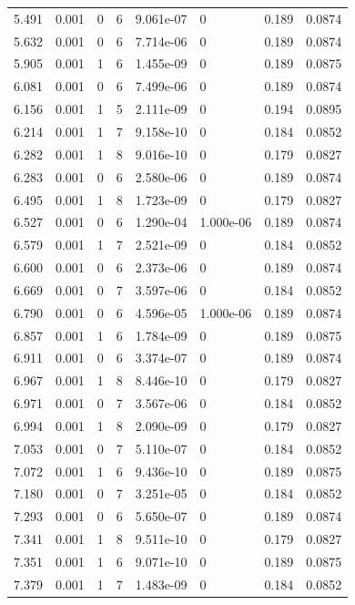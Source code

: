 \documentclass[preview]{standalone}
\begin{document}
{{\begin{tabular}{L{1.2cm}C{1.2cm} C{0.3cm}C{0.5cm} C{1.4cm}C{1.4cm} C{1.4cm}C{1.4cm}}
  5.491  &  0.001  & 0     &  6 &  9.061e-07  & 0  & 0.189 &  0.0874   \\ 
  5.632  &  0.001  & 0     &  6 &  7.714e-06  & 0  & 0.189 &  0.0874   \\ 
  5.905  &  0.001  & 1     &  6 &  1.455e-09  & 0  & 0.189 &  0.0875   \\ 
  6.081  &  0.001  & 0     &  6 &  7.499e-06  & 0  & 0.189 &  0.0874   \\ 
  6.156  &  0.001  & 1     &  5 &  2.111e-09  & 0  & 0.194 &  0.0895   \\ 
  6.214  &  0.001  & 1     &  7 &  9.158e-10  & 0  & 0.184 &  0.0852   \\ 
  6.282  &  0.001  & 1     &  8 &  9.016e-10  & 0  & 0.179 &  0.0827   \\ 
  6.283  &  0.001  & 0     &  6 &  2.580e-06  & 0  & 0.189 &  0.0874   \\ 
  6.495  &  0.001  & 1     &  8 &  1.723e-09  & 0  & 0.179 &  0.0827   \\ 
  6.527  &  0.001  & 0     &  6 &  1.290e-04  & 1.000e-06  & 0.189 &  0.0874   \\ 
  6.579  &  0.001  & 1     &  7 &  2.521e-09  & 0  & 0.184 &  0.0852   \\ 
  6.600  &  0.001  & 0     &  6 &  2.373e-06  & 0  & 0.189 &  0.0874   \\ 
  6.669  &  0.001  & 0     &  7 &  3.597e-06  & 0  & 0.184 &  0.0852   \\ 
  6.790  &  0.001  & 0     &  6 &  4.596e-05  & 1.000e-06  & 0.189 &  0.0874   \\ 
  6.857  &  0.001  & 1     &  6 &  1.784e-09  & 0  & 0.189 &  0.0875   \\ 
  6.911  &  0.001  & 0     &  6 &  3.374e-07  & 0  & 0.189 &  0.0874   \\ 
  6.967  &  0.001  & 1     &  8 &  8.446e-10  & 0  & 0.179 &  0.0827   \\ 
  6.971  &  0.001  & 0     &  7 &  3.567e-06  & 0  & 0.184 &  0.0852   \\ 
  6.994  &  0.001  & 1     &  8 &  2.090e-09  & 0  & 0.179 &  0.0827   \\ 
  7.053  &  0.001  & 0     &  7 &  5.110e-07  & 0  & 0.184 &  0.0852   \\ 
  7.072  &  0.001  & 1     &  6 &  9.436e-10  & 0  & 0.189 &  0.0875   \\ 
  7.180  &  0.001  & 0     &  7 &  3.251e-05  & 0  & 0.184 &  0.0852   \\ 
  7.293  &  0.001  & 0     &  6 &  5.650e-07  & 0  & 0.189 &  0.0874   \\ 
  7.341  &  0.001  & 1     &  8 &  9.511e-10  & 0  & 0.179 &  0.0827   \\ 
  7.351  &  0.001  & 1     &  6 &  9.071e-10  & 0  & 0.189 &  0.0875   \\ 
  7.379  &  0.001  & 1     &  7 &  1.483e-09  & 0  & 0.184 &  0.0852   \\ 
\hline 
\end{tabular} 

}}
\end{document}
